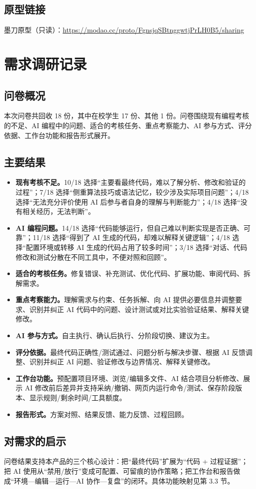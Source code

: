 \documentclass[UTF8,12pt,a4paper]{ctexart}
\begin{document}
\subsection{原型链接}

墨刀原型（只读）：\href{https://modao.cc/proto/FgnsjqSBtnggwtjPrLH0B5/sharing}{https://modao.cc/proto/FgnsjqSBtnggwtjPrLH0B5/sharing}

\newpage
\appendix
\section{需求调研记录}

\subsection{问卷概况}
本次问卷共回收 18 份，其中在校学生 17 份、其他 1 份。问卷围绕现有编程考核的不足、AI 编程中的问题、适合的考核任务、重点考察能力、AI 参与方式、评分依据、工作台功能和报告形式展开。

\subsection{主要结果}
\begin{itemize}[leftmargin=2em]
  \item \textbf{现有考核不足。}10/18 选择“主要看最终代码，难以了解分析、修改和验证的过程”；7/18 选择“侧重算法技巧或语法记忆，较少涉及实际项目问题”；4/18 选择“无法充分评价使用 AI 后参与者自身的理解与判断能力”；4/18 选择“没有相关经历，无法判断”。
  \item \textbf{AI 编程问题。}14/18 选择“代码能够运行，但自己难以判断实现是否正确、可靠”；11/18 选择“得到了 AI 生成的代码，却难以解释关键逻辑”；4/18 选择“配置环境或转移 AI 生成的代码占用了较多时间”；3/18 选择“对话、代码修改和测试分散在不同工具中，不便对照和回顾”。
  \item \textbf{适合的考核任务。}修复错误、补充测试、优化代码、扩展功能、审阅代码、拆解需求。
  \item \textbf{重点考察能力。}理解需求与约束、任务拆解、向 AI 提供必要信息并调整要求、识别并纠正 AI 代码中的问题、设计测试或对比实验验证结果、解释关键修改。
  \item \textbf{AI 参与方式。}自主执行、确认后执行、分阶段切换、建议为主。
  \item \textbf{评分依据。}最终代码正确性/测试通过、问题分析与解决步骤、根据 AI 反馈调整、识别并纠正 AI 问题、验证修改与边界情况、解释关键修改。
  \item \textbf{工作台功能。}预配置项目环境、浏览/编辑多文件、AI 结合项目分析修改、展示 AI 修改前后差异并支持采纳/撤销、网页内运行命令/测试、保存阶段版本、显示规则/剩余时间/工具额度。
  \item \textbf{报告形式。}方案对照、结果反馈、能力反馈、过程回顾。
\end{itemize}

\subsection{对需求的启示}
问卷结果支持本产品的三个核心设计：把“最终代码”扩展为“代码 + 过程证据”；把 AI 使用从“禁用/放行”变成可配置、可留痕的协作策略；把工作台和报告做成“环境—编辑—运行—AI 协作—复盘”的闭环。具体功能映射见第 3.3 节。
\end{document}
